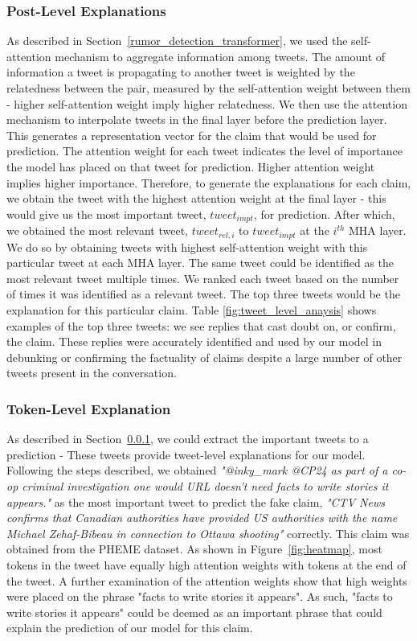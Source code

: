 \documentclass[letterpaper]{article} %
\begin{document}
\subsubsection{Post-Level Explanations}
\label{post_level_explanations}
As described in Section~\ref{rumor_detection_transformer}, we used the self-attention mechanism to aggregate information among tweets. The amount of information a tweet is propagating to another tweet is weighted by the relatedness between the pair, measured by the self-attention weight between them - higher self-attention weight imply higher relatedness. We then use the attention mechanism to interpolate tweets in the final layer before the prediction layer. This generates a representation vector for the claim that would be used for prediction. The attention weight for each tweet indicates the level of importance the model has placed on that tweet for prediction. Higher attention weight implies higher importance. 
Therefore, to generate the explanations for each claim, we obtain the tweet with the highest attention weight at the final layer - this would give us the most important tweet, $tweet_{impt}$, for prediction. After which, we obtained the most relevant tweet, $tweet_{rel,i}$ to $tweet_{impt}$ at the $i^{th}$ MHA layer. We do so by obtaining tweets with highest self-attention weight with this particular tweet at each MHA layer. The same tweet could be identified as the most relevant tweet multiple times. We ranked each tweet based on the number of times it was identified as a relevant tweet. The top three tweets would be the explanation for this particular claim. Table \ref{fig:tweet_level_anaysis} shows examples of the top three tweets: we see replies that cast doubt on, or confirm, the claim. These replies were accurately identified and used by our model in debunking or confirming the factuality of claims despite a large number of other tweets present in the conversation.

\subsubsection{Token-Level Explanation}
As described in Section~\ref{post_level_explanations}, we could extract the important tweets to a prediction - These tweets provide tweet-level explanations for our model. Following the steps described, we obtained \textit{"@inky\_mark @CP24 as part of a co-op criminal investigation one would URL doesn't need facts to write stories it appears."} as the most important tweet to predict the fake claim, \textit{"CTV News confirms that Canadian authorities have provided US authorities with the name Michael Zehaf-Bibeau in connection to Ottawa shooting"} correctly. This claim was obtained from the PHEME dataset. As shown in Figure~\ref{fig:heatmap}, most tokens in the tweet have equally high attention weights with tokens at the end of the tweet. A further examination of the attention weights show that high weights were placed on the phrase "facts to write stories it appears". As such, "facts to write stories it appears" could be deemed as an important phrase that could explain the prediction of our model for this claim.
\end{document}
